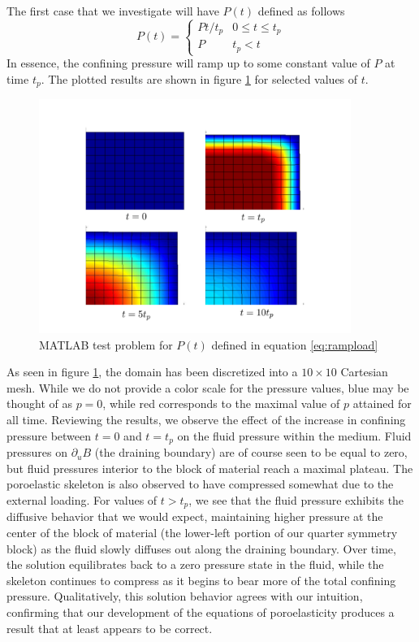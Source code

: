 \documentclass[11pt]{article} %
\begin{document}
The first case that we investigate will have $P(t)$ defined as follows
\begin{equation}
	P(t) =
	\left\{
	\begin{array}{ll}
		P t / t_p & 0 \le t \le t_p \\
		P & t_p < t
	\end{array}
	\right.
	\label{eq:rampload}
\end{equation}
In essence, the confining pressure will ramp up to some constant value of $P$ at time $t_p$. The plotted results are shown in figure \ref{fig:ramptest} for selected values of $t$.
\begin{figure} [!ht]
	\centering
	\includegraphics[width = 4.0in,trim=100 30 100 70,clip=true]{ramptest.pdf}
	\caption{MATLAB test problem for $P(t)$ defined in equation \ref{eq:rampload}}
	\label{fig:ramptest}
\end{figure}

As seen in figure \ref{fig:ramptest}, the domain has been discretized into a $10 \times 10$ Cartesian mesh. While we do not provide a color scale for the pressure values, blue may be thought of as $p = 0$, while red corresponds to the maximal value of $p$ attained for all time. Reviewing the results, we observe the effect of the increase in confining pressure between $t = 0$ and $t = t_p$ on the fluid pressure within the medium. Fluid pressures on $\partial_u B$ (the draining boundary) are of course seen to be equal to zero, but fluid pressures interior to the block of material reach a maximal plateau. The poroelastic skeleton is also observed to have compressed somewhat due to the external loading. For values of $t > t_p$, we see that the fluid pressure exhibits the diffusive behavior that we would expect, maintaining higher pressure at the center of the block of material (the lower-left portion of our quarter symmetry block) as the fluid slowly diffuses out along the draining boundary. Over time, the solution equilibrates back to a zero pressure state in the fluid, while the skeleton continues to compress as it begins to bear more of the total confining pressure. Qualitatively, this solution behavior agrees with our intuition, confirming that our development of the equations of poroelasticity produces a result that at least appears to be correct.
\end{document}
